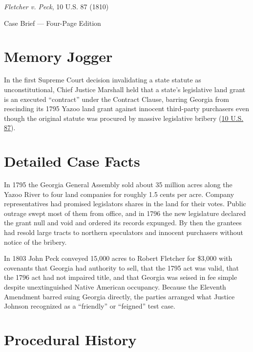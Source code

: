\documentclass[12pt]{article}
\begin{document}
\begin{center}
{\LARGE \textit{Fletcher v. Peck}, 10 U.S. 87 (1810)\par}
\vspace{0.8em}
{\large Case Brief --- Four-Page Edition\par}
\end{center}
\vspace{1em}

\section{Memory Jogger}

In the first Supreme Court decision invalidating a state statute as unconstitutional, Chief Justice Marshall held that a state's legislative land grant is an executed ``contract'' under the Contract Clause, barring Georgia from rescinding its 1795 Yazoo land grant against innocent third-party purchasers even though the original statute was procured by massive legislative bribery (\href{https://www.courtlistener.com/opinion/84935/fletcher-v-peck/}{10 U.S. 87}).

\section{Detailed Case Facts}

In 1795 the Georgia General Assembly sold about 35 million acres along the Yazoo River to four land companies for roughly 1.5 cents per acre. Company representatives had promised legislators shares in the land for their votes. Public outrage swept most of them from office, and in 1796 the new legislature declared the grant null and void and ordered its records expunged. By then the grantees had resold large tracts to northern speculators and innocent purchasers without notice of the bribery.

In 1803 John Peck conveyed 15,000 acres to Robert Fletcher for \$3,000 with covenants that Georgia had authority to sell, that the 1795 act was valid, that the 1796 act had not impaired title, and that Georgia was seised in fee simple despite unextinguished Native American occupancy. Because the Eleventh Amendment barred suing Georgia directly, the parties arranged what Justice Johnson recognized as a ``friendly'' or ``feigned'' test case.

\section{Procedural History}
\end{document}
